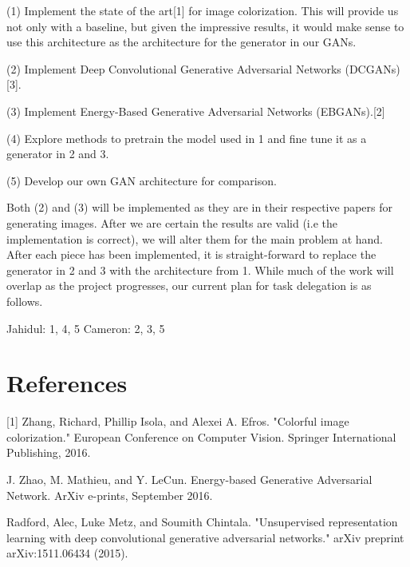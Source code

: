\documentclass{article}
\begin{document}
\vspace{2pt}
(1) Implement the state of the art[1] for image colorization. This will provide
\indent us not only with a baseline, but given the impressive results, it would make
\indent sense to use this architecture as the architecture for the generator in our
\indent GANs.

\vspace{3pt}
(2) Implement Deep Convolutional Generative Adversarial Networks \newline
\indent (DCGANs)[3]. 

\vspace{3pt}
(3) Implement Energy-Based Generative Adversarial Networks (EBGANs).[2]

\vspace{3pt}
(4) Explore methods to pretrain the model used in 1 and fine tune it as a
\indent generator in 2 and 3.

(5) Develop our own GAN architecture for comparison.

\vspace{4pt}

\noindent Both (2) and (3) will be implemented as they are in their respective papers for generating
images. After we are certain the results are valid (i.e the implementation is correct), we will alter
them for the main problem at hand. After each piece has been implemented, it is straight-forward to
replace the generator in 2 and 3 with the architecture from 1. While much of the work will overlap as the
project progresses, our current plan for task delegation is as follows. \newline

\noindent Jahidul: 1, 4, 5 \newline
\noindent Cameron: 2, 3, 5



\section{References}
[1] Zhang, Richard, Phillip Isola, and Alexei A. Efros. "Colorful image colorization." 
European Conference on Computer Vision. Springer International Publishing, 2016.
\vspace{2pt}

\noindent [2] J. Zhao, M. Mathieu, and Y. LeCun.  Energy-based Generative Adversarial 
Network. ArXiv e-prints, September 2016.
\vspace{2pt}

\noindent [3] Radford, Alec, Luke Metz, and Soumith Chintala. "Unsupervised representation learning with deep
convolutional generative adversarial networks." arXiv preprint arXiv:1511.06434 (2015).
\end{document}
